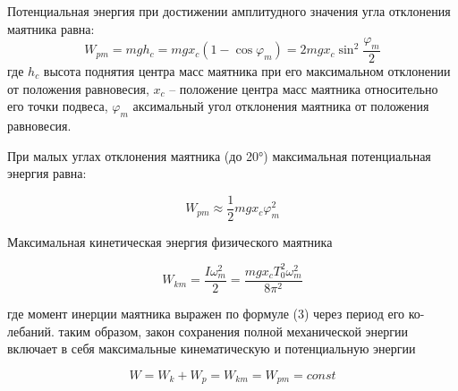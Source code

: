 \documentclass[12pt,a4paper]{article}%
\begin{document}
\begin{enumerate}
	Потенциальная энергия при достижении амплитудного значения угла
	отклонения маятника равна:
	\begin{equation}
	W_{pm} = mgh_c = mgx_c(1-\cos\varphi_m) = 2mgx_c\sin^2\dfrac{\varphi_m}{2}
	\end{equation}
	где $h_c$ высота поднятия центра масс маятника при его максимальном отклонении от положения равновесия, $x_c$ – положение центра масс маятника
	относительно его точки подвеса, $\varphi_m$ аксимальный угол отклонения маятника от положения равновесия.
	
	При малых углах отклонения маятника (до 20°) максимальная потенциальная энергия равна:
	
	\begin{equation}
	W_{pm} \approx \dfrac{1}{2}mgx_c\varphi_m^2
	\end{equation}
	
	Максимальная кинетическая энергия физического маятника
	
	\begin{equation}
	W_{km} = \dfrac{I\omega_m^2}{2} = \dfrac{mgx_cT_0^2\omega_m^2}{8\pi^2}
	\end{equation}
	
	где момент инерции маятника выражен по формуле (3) через период его ко-
	лебаний. таким образом, закон сохранения полной механической энергии включает в себя максимальные кинематическую и потенциальную энергии
	
	\begin{equation}
	W = W_k + W_p = W_{km} = W_{pm} = const
	\end{equation}
	
	
\end{enumerate}
\end{document}
